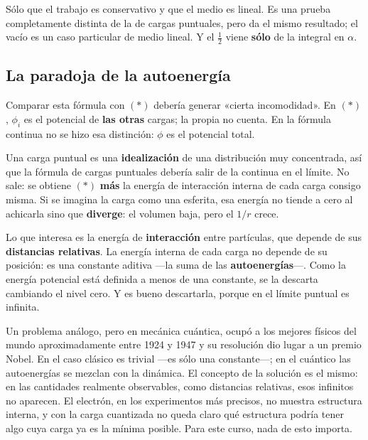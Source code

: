 \documentclass[12pt,a4paper]{article}
\begin{document}
\begin{notebox}
Sólo que el trabajo es conservativo y que el medio es lineal. Es una prueba
completamente distinta de la de cargas puntuales, pero da el mismo resultado; el
vacío es un caso particular de medio lineal. Y el $\tfrac12$ viene \textbf{sólo}
de la integral en $\alpha$.
\end{notebox}

\subsection{La paradoja de la autoenergía}
\label{sec:autoenergia}

Comparar esta fórmula con $(\ast)$ debería generar «cierta incomodidad». En
$(\ast)$, $\phi_i$ es el potencial de \textbf{las otras} cargas; la propia no
cuenta. En la fórmula continua no se hizo esa distinción: $\phi$ es el potencial
total.

Una carga puntual es una \textbf{idealización} de una distribución muy
concentrada, así que la fórmula de cargas puntuales debería salir de la continua
en el límite. No sale: se obtiene $(\ast)$ \textbf{más} la energía de interacción
interna de cada carga consigo misma. Si se imagina la carga como una esferita, esa
energía no tiende a cero al achicarla sino que \textbf{diverge}: el volumen baja,
pero el $1/r$ crece.

\begin{keybox}[Resolución]
Lo que interesa es la energía de \textbf{interacción} entre partículas, que
depende de sus \textbf{distancias relativas}. La energía interna de cada carga no
depende de su posición: es una constante aditiva ---la suma de las
\textbf{autoenergías}---. Como la energía potencial está definida a menos de una
constante, se la descarta cambiando el nivel cero. Y es bueno descartarla, porque
en el límite puntual es infinita.
\end{keybox}

\begin{notebox}
Un problema análogo, pero en mecánica cuántica, ocupó a los mejores físicos del
mundo aproximadamente entre 1924 y 1947 y su resolución dio lugar a un premio
Nobel. En el caso clásico es trivial ---es sólo una constante---; en el cuántico
las autoenergías se mezclan con la dinámica. El concepto de la solución es el
mismo: en las cantidades realmente observables, como distancias relativas, esos
infinitos no aparecen. El electrón, en los experimentos más precisos, no muestra
estructura interna, y con la carga cuantizada no queda claro qué estructura podría
tener algo cuya carga ya es la mínima posible. Para este curso, nada de esto
importa.
\end{notebox}
\end{document}
